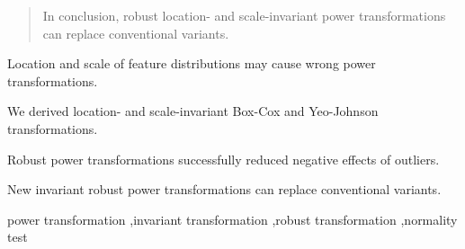 \documentclass[preprint,12pt,authoryear]{elsarticle}
\begin{document}
\begin{frontmatter}
\begin{abstract}
In conclusion, robust location- and scale-invariant power
transformations can replace conventional variants.
\end{abstract}


%
%

\begin{highlights}
\item Location and scale of feature distributions may cause wrong power transformations.
\item We derived location- and scale-invariant Box-Cox and Yeo-Johnson transformations.
\item Robust power transformations successfully reduced negative effects of outliers.
\item New invariant robust power transformations can replace conventional variants.
\end{highlights}

\begin{keyword}

power transformation \sep invariant transformation \sep robust transformation \sep normality test



\end{keyword}

\end{frontmatter}
\end{document}
